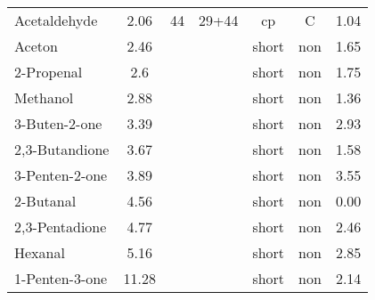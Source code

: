\begin{table*}
\begin{center}
\begin{tabular}{lcccccc}
Acetaldehyde&2.06&44&29+44&cp&C&1.04\\
Aceton&2.46&&&short&non&1.65\\
2-Propenal&2.6&&&short&non&1.75\\
Methanol&2.88&&&short&non&1.36\\
3-Buten-2-one&3.39&&&short&non&2.93\\
2,3-Butandione&3.67&&&short&non&1.58\\
3-Penten-2-one&3.89&&&short&non&3.55\\
2-Butanal&4.56&&&short&non&0.00\\
2,3-Pentadione&4.77&&&short&non&2.46\\
Hexanal&5.16&&&short&non&2.85\\
1-Penten-3-one&11.28&&&short&non&2.14\\
\hline
\end{tabular}
\end{center}
\label{tab:pyrprod3}
\end{table*}

